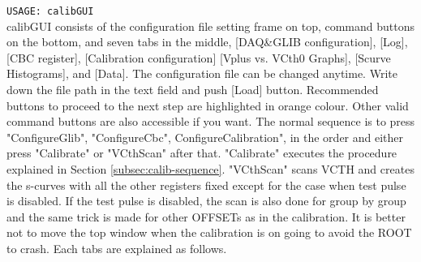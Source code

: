 \documentclass[11pt,a4paper]{article}
\begin{document}
	\verb|USAGE: calibGUI|\\
		calibGUI consists of the configuration file setting frame on top, command buttons on the bottom, and seven tabs in the middle, [DAQ\&GLIB configuration], [Log], [CBC register], 
	[Calibration configuration] [Vplus vs. VCth0 Graphs], [Scurve Histograms], and [Data].
	The configuration file can be changed anytime. Write down the file path in the text field and push [Load] button.  Recommended buttons to proceed to the next step are highlighted in orange colour. Other valid command buttons are also accessible if you want.
	The normal sequence is to press "ConfigureGlib", "ConfigureCbc", ConfigureCalibration", in the order and either press "Calibrate" or "VCthScan" after that.
	"Calibrate" executes the procedure explained in Section \ref{subsec:calib-sequence}.
	"VCthScan" scans VCTH and creates the s-curves with all the other registers fixed except for the case when test pulse is disabled. 
	If the test pulse is disabled, the scan is also done for group by group and the same trick is made for other OFFSETs as in the calibration. 
	It is better not to move the top window when the calibration is on going to avoid the ROOT to crash.
	Each tabs are explained as follows.
\end{document}
